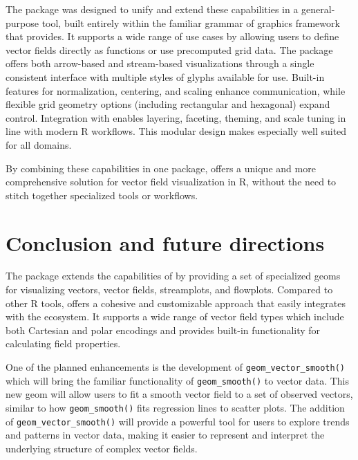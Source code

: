 The  package was designed to unify and extend these capabilities in a general-purpose tool, built entirely within the familiar grammar of graphics framework that  provides. It supports a wide range of use cases by allowing users to define vector fields directly as functions or use precomputed grid data. The package offers both arrow-based and stream-based visualizations through a single consistent interface with multiple styles of glyphs available for use. Built-in features for normalization, centering, and scaling enhance communication, while flexible grid geometry options (including rectangular and hexagonal) expand control. Integration with  enables layering, faceting, theming, and scale tuning in line with modern R workflows. This modular design makes  especially well suited for all domains.

By combining these capabilities in one package,  offers a unique and more comprehensive solution for vector field visualization in R, without the need to stitch together specialized tools or workflows.

\section{Conclusion and future directions}\label{conclusion-and-future-directions}

The  package extends the capabilities of  by providing a set of specialized geoms for visualizing vectors, vector fields, streamplots, and flowplots. Compared to other R tools,  offers a cohesive and customizable approach that easily integrates with the  ecosystem. It supports a wide range of vector field types which include both Cartesian and polar encodings and provides built-in functionality for calculating field properties.

One of the planned enhancements is the development of \texttt{geom\_vector\_smooth()} which will bring the familiar functionality of \texttt{geom\_smooth()} to vector data. This new geom will allow users to fit a smooth vector field to a set of observed vectors, similar to how \texttt{geom\_smooth()} fits regression lines to scatter plots. The addition of \texttt{geom\_vector\_smooth()} will provide a powerful tool for users to explore trends and patterns in vector data, making it easier to represent and interpret the underlying structure of complex vector fields.


